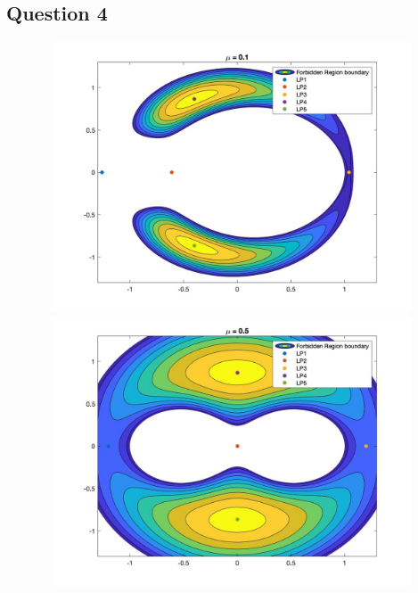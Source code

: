 \documentclass[11pt]{article}
\begin{document}
\subsection{Question 4}
\newpage
\begin{figure}[H]
\includegraphics[width = 12cm, height = 8cm]{Q4(1)}
\includegraphics[width = 12cm, height = 8cm]{Q4(2)}
\end{figure}
\end{document}
